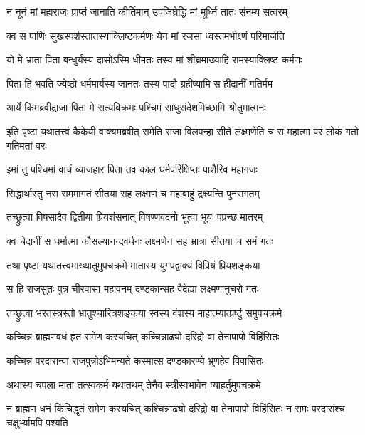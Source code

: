 \twolineshloka
{न नूनं मां महाराजः प्राप्तं जानाति कीर्तिमान्}
{उपजिघ्रेद्धि मां मूर्ध्नि तातः संनम्य सत्वरम्} %

\twolineshloka
{क्व स पाणिः सुखस्पर्शस्तातस्याक्लिष्टकर्मणः}
{येन मां रजसा ध्वस्तमभीक्ष्णं परिमार्जति} %

\twolineshloka
{यो मे भ्राता पिता बन्धुर्यस्य दासोऽस्मि धीमतः}
{तस्य मां शीघ्रमाख्याहि रामस्याक्लिष्ट कर्मणः} %

\twolineshloka
{पिता हि भवति ज्येष्ठो धर्ममार्यस्य जानतः}
{तस्य पादौ ग्रहीष्यामि स हीदानीं गतिर्मम} %

\twolineshloka
{आर्ये किमब्रवीद्राजा पिता मे सत्यविक्रमः}
{पश्चिमं साधुसंदेशमिच्छामि श्रोतुमात्मनः} %

\threelineshloka
{इति पृष्टा यथातत्त्वं कैकेयी वाक्यमब्रवीत्}
{रामेति राजा विलपन्हा सीते लक्ष्मणेति च}
{स महात्मा परं लोकं गतो गतिमतां वरः} %

\twolineshloka
{इमां तु पश्चिमां वाचं व्याजहार पिता तव}
{काल धर्मपरिक्षिप्तः पाशैरिव महागजः} %

\twolineshloka
{सिद्धार्थास्तु नरा राममागतं सीतया सह}
{लक्ष्मणं च महाबाहुं द्रक्ष्यन्ति पुनरागतम्} %

\twolineshloka
{तच्छ्रुत्वा विषसादैव द्वितीया प्रियशंसनात्}
{विषण्णवदनो भूत्वा भूयः पप्रच्छ मातरम्} %

\twolineshloka
{क्व चेदानीं स धर्मात्मा कौसल्यानन्दवर्धनः}
{लक्ष्मणेन सह भ्रात्रा सीतया च समं गतः} %

\twolineshloka
{तथा पृष्टा यथातत्त्वमाख्यातुमुपचक्रमे}
{मातास्य युगपद्वाक्यं विप्रियं प्रियशङ्कया} %

\twolineshloka
{स हि राजसुतः पुत्र चीरवासा महावनम्}
{दण्डकान्सह वैदेह्या लक्ष्मणानुचरो गतः} %

\twolineshloka
{तच्छ्रुत्वा भरतस्त्रस्तो भ्रातुश्चारित्रशङ्कया}
{स्वस्य वंशस्य माहात्म्यात्प्रष्टुं समुपचक्रमे} %

\twolineshloka
{कच्चिन्न ब्राह्मणवधं हृतं रामेण कस्यचित्}
{कच्चिन्नाढ्यो दरिद्रो वा तेनापापो विहिंसितः} %

\twolineshloka
{कच्चिन्न परदारान्वा राजपुत्रोऽभिमन्यते}
{कस्मात्स दण्डकारण्ये भ्रूणहेव विवासितः} %

\twolineshloka
{अथास्य चपला माता तत्स्वकर्म यथातथम्}
{तेनैव स्त्रीस्वभावेन व्याहर्तुमुपचक्रमे} %

\threelineshloka
{न ब्राह्मण धनं किंचिद्धृतं रामेण कस्यचित्}
{कश्चिन्नाढ्यो दरिद्रो वा तेनापापो विहिंसितः}
{न रामः परदारांश्च चक्षुर्भ्यामपि पश्यति} %


